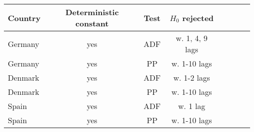 \begin{tabular}{lccccccc}
\toprule
Country &Deterministic constant
            &Test   &$H_0$ rejected\\
\midrule
Germany &yes&ADF    &w. 1, 4, 9 lags\\
Germany &yes&PP     &w. 1-10 lags   \\
\midrule
Denmark &yes&ADF    &w. 1-2 lags    \\
Denmark &yes&PP     &w. 1-10 lags   \\
\midrule
Spain   &yes&ADF    &w. 1 lag       \\
Spain   &yes&PP     &w. 1-10 lags   \\
\bottomrule \end{tabular} \\ 
%
%
%     
